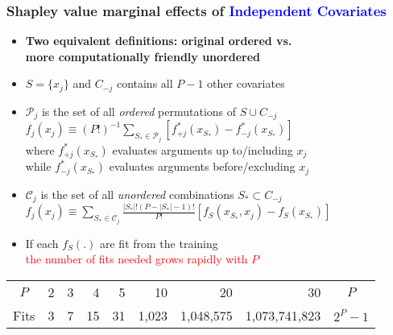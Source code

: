 \documentclass[11pt,dvipsnames,usenames,times]{beamer}
\newcommand*{\red}[1]{\textcolor{red}{#1}}%
\newcommand*{\blue}[1]{\textcolor{blue}{#1}}%
\begin{document}
\begin{frame}[fragile]\frametitle{Shapley value marginal effects of \blue{Independent Covariates}}
\begin{itemize}

\item {\bf Two equivalent definitions: original ordered vs.\ \\
more computationally friendly unordered}
\item $S=\{x_j\}$ and $C_{-j}$ contains all $P-1$ other covariates
\item $\mathcal{P}_j$ is the set of all {\it ordered} permutations of
  $S \cup C_{-j}$\\
  $f_j(x_j) \equiv (P!)^{-1} \sum_{S_* \in \mathcal{P}_j}
  [f_{+j}^{*}(x_{S_*}) - f_{-j}^{*}(x_{S_*})] $\\
where $f_{+j}^{*}(x_{S_*})$ evaluates arguments up to/including $x_j$\\
while $f_{-j}^{*}(x_{S_*})$ evaluates arguments before/excluding $x_j$
\item $\mathcal{C}_j$ is the set of all {\it unordered} combinations $S_* \subset C_{-j}$\\
$f_j(x_j) \equiv  \sum_{S_* \in \mathcal{C}_j}
  \frac{|S_*|!(P-|S_*|-1)!}{P!}
  [f_{S}(x_{S_*}, x_j) - f_{S}(x_{S_*})] $
\item If each $ f_{S}(.) $ are fit from the training\\ 
\red{the number of fits needed grows rapidly with $P$}
\end{itemize}
\begin{tabular}{crrrrrrrc} \hline
$P$  & 2 & 3 &  4 &  5 &   10 &      20 &         30 & $P$ \\
Fits & 3 & 7 & 15 & 31 & 1,023 & 1,048,575 & 1,073,741,823 &$2^P-1$ \\ \hline
\end{tabular}
 

\end{frame}
\end{document}
